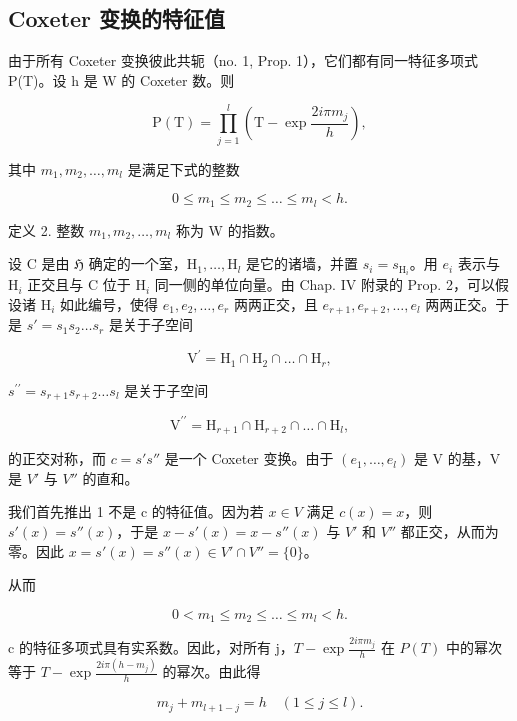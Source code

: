\subsection{Coxeter 变换的特征值}

由于所有 Coxeter 变换彼此共轭（no. 1, Prop. 1），它们都有同一特征多项式 P(T)。设 h 是 W 的 Coxeter 数。则

\[
\mathrm{P} (\mathrm{T}) = \prod_ {j = 1} ^ {l} \left(\mathrm{T} - \exp \frac {2 i \pi m _ {j}}{h}\right),
\]

其中 \(m_{1}, m_{2}, \ldots, m_{l}\) 是满足下式的整数

\[
0 \leqslant m _ {1} \leqslant m _ {2} \leqslant \dots \leqslant m _ {l} <   h.
\]

定义 2. 整数 \(m_1, m_2, \ldots, m_l\) 称为 W 的指数。

设 C 是由 \(\mathfrak{H}\) 确定的一个室，\(\mathrm{H}_1, \ldots, \mathrm{H}_l\) 是它的诸墙，并置 \(s_i = s_{\mathrm{H}_i}\)。用 \(e_i\) 表示与 \(\mathrm{H}_i\) 正交且与 C 位于 \(\mathrm{H}_i\) 同一侧的单位向量。由 Chap. IV 附录的 Prop. 2，可以假设诸 \(\mathrm{H}_i\) 如此编号，使得 \(e_1, e_2, \ldots, e_r\) 两两正交，且 \(e_{r+1}, e_{r+2}, \ldots, e_l\) 两两正交。于是 \(s' = s_1 s_2 \ldots s_r\) 是关于子空间

\[
\mathrm{V} ^ {\prime} = \mathrm{H} _ {1} \cap \mathrm{H} _ {2} \cap \dots \cap \mathrm{H} _ {r},
\]

\(s^{\prime \prime} = s_{r + 1}s_{r + 2}\dots s_{l}\) 是关于子空间

\[
\mathrm{V} ^ {\prime \prime} = \mathrm{H} _ {r + 1} \cap \mathrm{H} _ {r + 2} \cap \dots \cap \mathrm{H} _ {l},
\]

的正交对称，而 \(c = s's''\) 是一个 Coxeter 变换。由于 \((e_{1}, \ldots, e_{l})\) 是 V 的基，V 是 \(V'\) 与 \(V''\) 的直和。

我们首先推出 1 不是 c 的特征值。因为若 \(x \in V\) 满足 \(c(x) = x\)，则 \(s'(x) = s''(x)\)，于是 \(x - s'(x) = x - s''(x)\) 与 \(V'\) 和 \(V''\) 都正交，从而为零。因此 \(x = s'(x) = s''(x) \in V' \cap V'' = \{0\}\)。

从而

\[
0 <   m _ {1} \leqslant m _ {2} \leqslant \dots \leqslant m _ {l} <   h.\tag{1}
\]

c 的特征多项式具有实系数。因此，对所有 j，\(T - \exp\frac{2i\pi m_{j}}{h}\) 在 \(P(T)\) 中的幂次等于 \(T - \exp\frac{2i\pi(h - m_{j})}{h}\) 的幂次。由此得

\[
m _ {j} + m _ {l + 1 - j} = h \quad (1 \leqslant j \leqslant l).\tag{2}
\]

